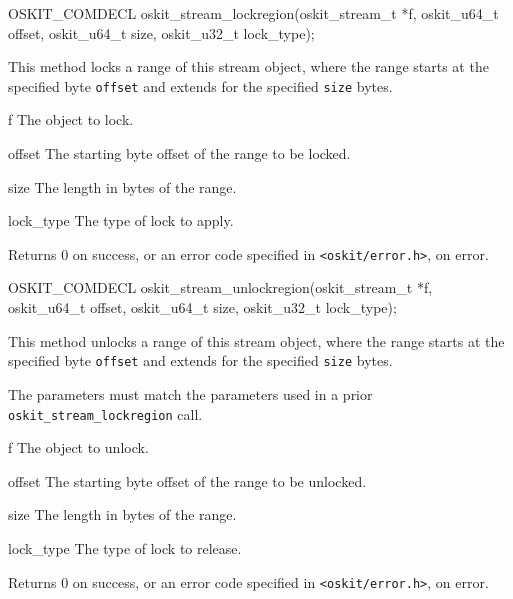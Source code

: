 \begin{apisyn}

	\funcproto OSKIT_COMDECL
	oskit_stream_lockregion(oskit_stream_t *f, 
			       oskit_u64_t offset, 
	                       oskit_u64_t size,
			       oskit_u32_t lock_type);
\end{apisyn}
\begin{apidesc}
	This method locks a range of this stream object,
	where the range starts at the specified byte {\tt offset}
	and extends for the specified {\tt size} bytes. 
\end{apidesc}
\begin{apiparm}
	\item[f]
		The object to lock.
	\item[offset]
		The starting byte offset of the range to be locked.
	\item[size]
		The length in bytes of the range.
	\item[lock_type]
		The type of lock to apply.
\end{apiparm}
\begin{apiret}
	Returns 0 on success, or an error code specified in
	{\tt <oskit/error.h>}, on error.
\end{apiret}


\begin{apisyn}

	\funcproto OSKIT_COMDECL
	oskit_stream_unlockregion(oskit_stream_t *f, 
			       oskit_u64_t offset, 
	                       oskit_u64_t size,
			       oskit_u32_t lock_type);
\end{apisyn}
\begin{apidesc}
	This method unlocks a range of this stream object,
	where the range starts at the specified byte {\tt offset}
	and extends for the specified {\tt size} bytes. 

	The parameters must match the parameters used in
	a prior {\tt oskit_stream_lockregion} call.
\end{apidesc}
\begin{apiparm}
	\item[f]
		The object to unlock.
	\item[offset]
		The starting byte offset of the range to be unlocked.
	\item[size]
		The length in bytes of the range.
	\item[lock_type]
		The type of lock to release.
\end{apiparm}
\begin{apiret}
	Returns 0 on success, or an error code specified in
	{\tt <oskit/error.h>}, on error.
\end{apiret}



